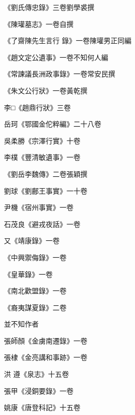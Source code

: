 \begin{pinyinscope}
 《劉氏傳忠錄》三卷劉學裘撰



 《陳瓘墓志》一卷自撰



 《了齋陳先生言行
 錄》一卷陳瓘男正同編



 《趙文定公遺事》一卷不知何人編



 《常諫議長洲政事錄》一卷常安民撰



 《朱文公行狀》一卷黃乾撰



 李□《趙鼎行狀》三卷



 岳珂《鄂國金佗粹編》二十八卷



 吳柔勝《宗澤行實》十卷



 李樸《豐清敏遺事》一卷



 《劉岳李魏傳》二卷張穎撰



 劉球《劉鄜王事實》一十卷



 尹機《宿州事實》一卷



 石茂良《避戎夜話》一卷



 又《靖康錄》一卷



 《中興禦侮錄》一卷



 《皇華錄》一卷



 《南北歡盟錄》一卷



 《裔夷謀夏錄》二卷



 並不知作者



 張師顏《金虜南遷錄》一卷



 張棣《金亮講和事跡》一卷



 洪
 遵《泉志》十五卷



 張甲《浸銅要錄》一卷



 姚康《唐登科記》十五卷




\end{pinyinscope}
